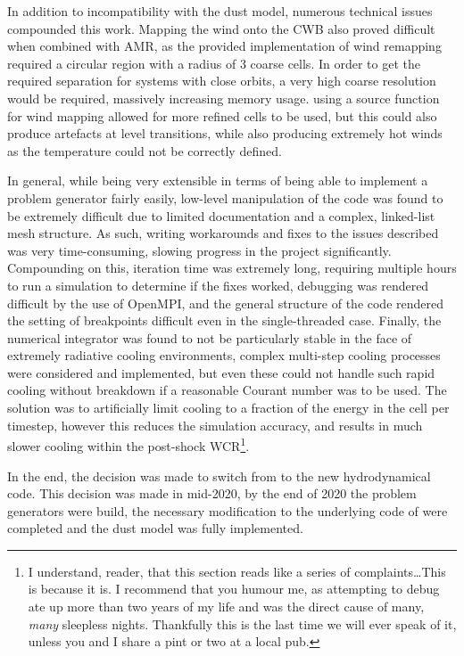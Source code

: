 In addition to incompatibility with the dust model, numerous technical issues compounded this work.
Mapping the wind onto the CWB also proved difficult when combined with AMR, as the provided implementation of wind remapping required a circular region with a radius of 3 coarse cells.
In order to get the required separation for systems with close orbits, a very high coarse resolution would be required, massively increasing memory usage.
using a source function for wind mapping allowed for more refined cells to be used, but this could also produce artefacts at level transitions, while also producing extremely hot winds as the temperature could not be correctly defined.

In general, while being very extensible in terms of being able to implement a problem generator fairly easily, low-level manipulation of the code was found to be extremely difficult due to limited documentation and a complex, linked-list mesh structure.
As such, writing workarounds and fixes to the issues described was very time-consuming, slowing progress in the project significantly.
Compounding on this, iteration time was extremely long, requiring multiple hours to run a simulation to determine if the fixes worked, debugging was rendered difficult by the use of OpenMPI, and the general structure of the code rendered the setting of breakpoints difficult even in the single-threaded case.
Finally, the numerical integrator was found to not be particularly stable in the face of extremely radiative cooling environments, complex multi-step cooling processes were considered and implemented, but even these could not handle such rapid cooling without breakdown if a reasonable Courant number was to be used.
The solution was to artificially limit cooling to a fraction of the energy in the cell per timestep, however this reduces the simulation accuracy, and results in much slower cooling within the post-shock WCR\footnote{I understand, reader, that this section reads like a series of complaints\ldots This is because it is. I recommend that you humour me, as attempting to debug \mg{} ate up more than two years of my life and was the direct cause of many, \textit{many} sleepless nights. Thankfully this is the last time we will ever speak of it, unless you and I share a pint or two at a local pub.}.

In the end, the decision was made to switch from \mg{} to the new \athena{} hydrodynamical code.
This decision was made in mid-2020, by the end of 2020 the problem generators were build, the necessary modification to the underlying code of \athena{} were completed and the dust model was fully implemented.

